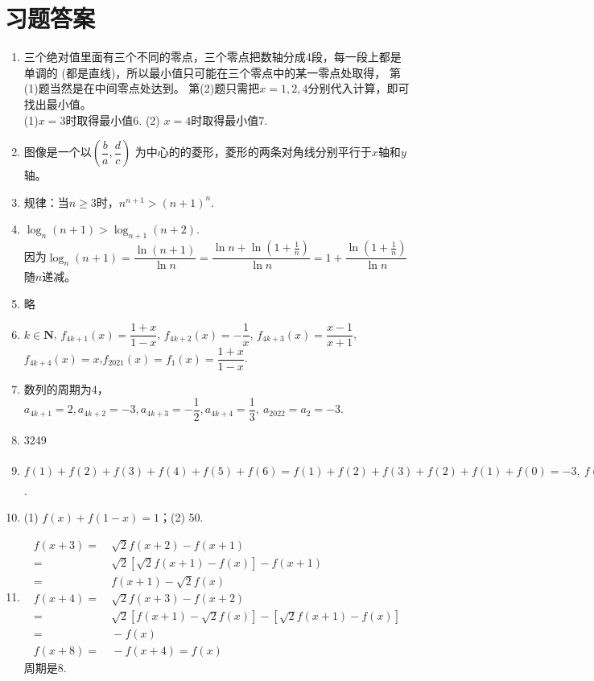 \section{习题答案}
\begin{enumerate}[label={\textbf{\arabic*.}},leftmargin=
    \inteval{\myenumleftmargin}pt]
\item 三个绝对值里面有三个不同的零点，三个零点把数轴分成4段，每一段上都是单调的
(都是直线)，所以最小值只可能在三个零点中的某一零点处取得，
第(1)题当然是在中间零点处达到。
第(2)题只需把$ x=1,2,4 $分别代入计算，即可找出最小值。\\
(1)$ x=3 $时取得最小值6. \quad (2) $ x=4 $时取得最小值7. 


\item 图像是一个以$ \left(\dfrac{b}{a},\dfrac{d}{c}\right) $
为中心的的菱形，菱形的两条对角线分别平行于$ x $轴和$ y $轴。

\item 规律：当$ n\geq 3 $时，$ n^{n+1}>(n+1)^n $. 

\item $ \log_n (n+1) > \log_{n+1} (n+2) $. \\ 因为$ \log_n (n+1)=
\dfrac{\ln (n+1)}{\ln n}=\dfrac{\ln n+\ln\left(1+\frac{1}{n}
    \right)}{\ln n}=1+\dfrac{\ln\left(1+\frac{1}{n}
    \right)}{\ln n} $随$ n $递减。

\item 略

\item 
$ k\in \textbf{N} $, $ f_{4k+1}(x)=\dfrac{1+x}{1-x} $,
$ f_{4k+2}(x)=-\dfrac{1}{x} $, $ f_{4k+3}(x)=\dfrac{x-1}{x+1} $,
$ f_{4k+4}(x)=x $,$ f_{2021}(x)=f_1(x)=\dfrac{1+x}{1-x} $. 

\item 数列的周期为4，$ a_{4k+1}=2,a_{4k+2}=-3,a_{4k+3}
=-\dfrac{1}{2},a_{4k+4}=\dfrac{1}{3},\ a_{2022}=a_2=-3 $. 

\item 3249

\item 
$ f(1)+f(2)+f(3)+f(4)+f(5)+f(6)=f(1)+f(2)+f(3)+f(2)+f(1)+f(0)=-3,\ 
f(1)+f(2)+\cdots +f(2022)=\dfrac{2022}{6}[f(1)+f(2)+\cdots+f(6)]=-1011 $. 

\item 
(1) $ f(x)+f(1-x)=1 $；\quad (2) 50.

\item 
\begin{align*}
    f(x+3) =&\ \sqrt{2}f(x+2)-f(x+1) \\
    =&\  \sqrt{2}[\sqrt{2}f(x+1)-f(x)]-f(x+1) \\
    =&\ f(x+1)-\sqrt{2}f(x) \\
    f(x+4) =&\ \sqrt{2}f(x+3)-f(x+2) \\
    =&\  \sqrt{2}[f(x+1)-\sqrt{2}f(x)]-[\sqrt{2}f(x+1)-f(x)] \\
    =&\ -f(x) \\
    f(x+8)=&\ -f(x+4)=f(x)
\end{align*} 
周期是8.


\end{enumerate}
